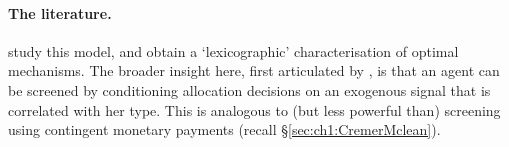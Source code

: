 \paragraph{The literature.}
\textcite{BlochDuttaDziubinski2021} study this model, and obtain a  `lexicographic' characterisation of optimal mechanisms.
The broader insight here, first articulated by \textcite{Kattwinkel2019}, is that an agent can be screened by conditioning allocation decisions on an exogenous signal that is correlated with her type.
This is analogous to (but less powerful than) screening using contingent monetary payments (recall §\ref{sec:ch1:CremerMclean}).
